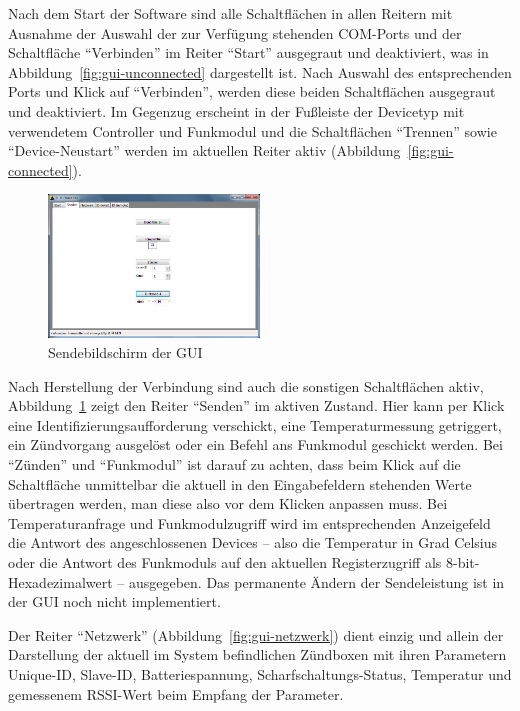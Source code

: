 \documentclass[pdftex, parskip, numbers=noenddot, toc=listof]{scrbook}
\begin{document}
			Nach dem Start der Software sind alle Schaltflächen in allen Reitern mit Ausnahme der Auswahl der zur Verfügung stehenden COM-Ports und der Schaltfläche \enquote{Verbinden} im Reiter \enquote{Start} ausgegraut und deaktiviert, was in Abbildung~\ref{fig:gui-unconnected} dargestellt ist. Nach Auswahl des entsprechenden Ports und Klick auf \enquote{Verbinden}, werden diese beiden Schaltflächen ausgegraut und deaktiviert. Im Gegenzug erscheint in der Fußleiste der Devicetyp mit verwendetem Controller und Funkmodul und die Schaltflächen \enquote{Trennen} sowie \enquote{Device-Neustart} werden im aktuellen Reiter aktiv (Abbildung~\ref{fig:gui-connected}).%
			\begin{figure}[!b]
				\centering
				\includegraphics[width=0.5\textwidth]{bilder/gui-senden}
				\caption{Sendebildschirm der GUI}
				\label{fig:gui-senden}
			\end{figure}

			Nach Herstellung der Verbindung sind auch die sonstigen Schaltflächen aktiv, Abbildung~\ref{fig:gui-senden} zeigt den Reiter \enquote{Senden} im aktiven Zustand. Hier kann per Klick eine Identifizierungsaufforderung verschickt, eine Temperaturmessung getriggert, ein Zündvorgang ausgelöst oder ein Befehl ans Funkmodul geschickt werden. Bei \enquote{Zünden} und \enquote{Funkmodul} ist darauf zu achten, dass beim Klick auf die Schaltfläche unmittelbar die aktuell in den Eingabefeldern stehenden Werte übertragen werden, man diese also vor dem Klicken anpassen muss. Bei Temperaturanfrage und Funkmodulzugriff wird im entsprechenden Anzeigefeld die Antwort des angeschlossenen Devices -- also die Temperatur in Grad Celsius oder die Antwort des Funkmoduls auf den aktuellen Registerzugriff als 8-bit-Hexadezimalwert -- ausgegeben. Das permanente Ändern der Sendeleistung ist in der GUI noch nicht implementiert.

			Der Reiter \enquote{Netzwerk} (Abbildung~\ref{fig:gui-netzwerk}) dient einzig und allein der Darstellung der aktuell im System befindlichen Zündboxen mit ihren Parametern Unique-ID, Slave-ID, Batteriespannung, Scharf\-schaltungs-Status, Temperatur und gemessenem RSSI-Wert beim Empfang der Parameter.
\end{document}
